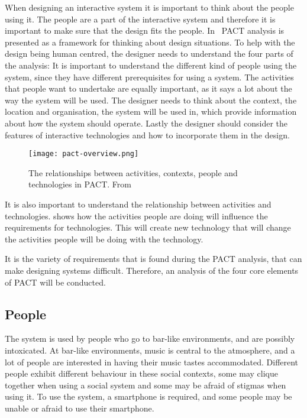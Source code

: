 When designing an interactive system it is important to think about the people using it. The people are a part of the interactive system and therefore it is important to make sure that the design fits the people. In~\cite{benyon2013designing} PACT analysis is presented as a framework for thinking about design situations. To help with the design being human centred, the designer needs to understand the four parts of the analysis: It is important to understand the different kind of people using the system, since they have different prerequisites for using a system. The activities that people want to undertake are equally important, as it says a lot about the way the system will be used. The designer needs to think about the context, the location and organisation, the system will be used in, which provide information about how the system should operate. Lastly the designer should consider the features of interactive technologies and how to incorporate them in the design.

\begin{figure}
  \centering
  \texttt{[image: pact-overview.png]}
  \caption{The relationships between activities, contexts, people and technologies in PACT. From~\cite{benyon2013designing}}
  \label{fig:pact-overview}
\end{figure}

It is also important to understand the relationship between activities and technologies.  shows how the activities people are doing will influence the requirements for technologies. This will create new technology that will change the activities people will be doing with the technology.

It is the variety of requirements that is found during the PACT analysis, that can make designing systems difficult. Therefore, an analysis of the four core elements of PACT will be conducted.


\subsection{People}
\label{sub:pact_people}

The system is used by people who go to bar-like environments, and are possibly intoxicated. At bar-like environments, music is central to the atmosphere, and a lot of people are interested in having their music tastes accommodated. Different people exhibit different behaviour in these social contexts, some may clique together when using a social system and some may be afraid of stigmas when using it. To use the system, a smartphone is required, and some people may be unable or afraid  to use their smartphone.

